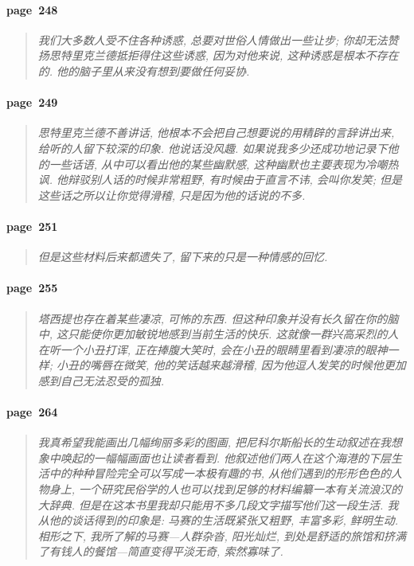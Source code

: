 \paragraph*{page~248}
\begin{quotation}
    \itshape
    我们大多数人受不住各种诱惑, 总要对世俗人情做出一些让步; 你却无法赞扬思特里克兰德抵拒得住这些诱惑, 因为对他来说, 这种诱惑是根本不存在的. 他的脑子里从来没有想到要做任何妥协. 
\end{quotation}

\paragraph*{page~249}
\begin{quotation}
    \itshape
    思特里克兰德不善讲话, 他根本不会把自己想要说的用精辟的言辞讲出来, 给听的人留下较深的印象. 他说话没风趣. 如果说我多少还成功地记录下他的一些话语, 从中可以看出他的某些幽默感, 这种幽默也主要表现为冷嘲热讽. 他辩驳别人话的时候非常粗野, 有时候由于直言不讳, 会叫你发笑; 但是这些话之所以让你觉得滑稽, 只是因为他的话说的不多. 
\end{quotation}

\paragraph*{page~251}
\begin{quotation}
    \itshape
    但是这些材料后来都遗失了, 留下来的只是一种情感的回忆. 
\end{quotation}

\paragraph*{page~255}
\begin{quotation}
    \itshape
    塔西提也存在着某些凄凉, 可怖的东西. 但这种印象并没有长久留在你的脑中, 这只能使你更加敏锐地感到当前生活的快乐. 这就像一群兴高采烈的人在听一个小丑打诨, 正在捧腹大笑时, 会在小丑的眼睛里看到凄凉的眼神一样; 小丑的嘴唇在微笑, 他的笑话越来越滑稽, 因为他逗人发笑的时候他更加感到自己无法忍受的孤独. 
\end{quotation}

\paragraph*{page~264}
\begin{quotation}
    \itshape
    我真希望我能画出几幅绚丽多彩的图画, 把尼科尔斯船长的生动叙述在我想象中唤起的一幅幅画面也让读者看到. 他叙述他们两人在这个海港的下层生活中的种种冒险完全可以写成一本极有趣的书, 从他们遇到的形形色色的人物身上, 一个研究民俗学的人也可以找到足够的材料编纂一本有关流浪汉的大辞典. 但是在这本书里我却只能用不多几段文字描写他们这一段生活. 我从他的谈话得到的印象是: 马赛的生活既紧张又粗野, 丰富多彩, 鲜明生动. 相形之下, 我所了解的马赛---人群杂沓, 阳光灿烂, 到处是舒适的旅馆和挤满了有钱人的餐馆---简直变得平淡无奇, 索然寡味了. 
\end{quotation}

